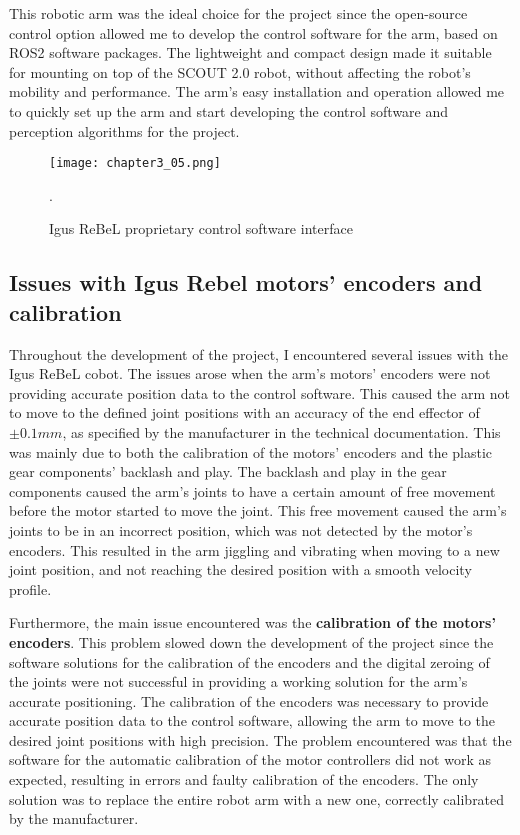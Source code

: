 This robotic arm was the ideal choice for the project since the open-source control option allowed me to develop
the control software for the arm, based on ROS2 software packages. The lightweight and compact design made it suitable
for mounting on top of the SCOUT 2.0 robot, without affecting the robot's mobility and performance. 
The arm's easy installation and operation allowed me to quickly set up the arm and start developing the control software
and perception algorithms for the project.

\begin{figure}[t]
    \centering
    \texttt{[image: chapter3\_05.png]}
    \captionsetup{width=1\linewidth}
    \caption{Igus ReBeL proprietary control software interface}.
    \label{fig:c3_img05}
\end{figure}

\subsection*{Issues with Igus Rebel motors' encoders and calibration}

Throughout the development of the project, I encountered several issues with the Igus ReBeL cobot.
The issues arose when the arm's motors' encoders were not providing accurate position data to the control software.
This caused the arm not to move to the defined joint positions with an accuracy of the end effector of $\pm 0.1mm$,
as specified by the manufacturer in the technical documentation.
This was mainly due to both the calibration of the motors' encoders and the plastic gear components' backlash and play.
The backlash and play in the gear components caused the arm's joints to have a certain amount of free movement before the motor
started to move the joint. This free movement caused the arm's joints to be in an incorrect position, which was not detected
by the motor's encoders. This resulted in the arm jiggling and vibrating when moving to a new joint position, and not reaching
the desired position with a smooth velocity profile.

Furthermore, the main issue encountered was the \textbf{calibration of the motors' encoders}.
This problem slowed down the development
of the project since the software solutions for the calibration of the encoders and the digital zeroing of the joints were not
successful in providing a working solution for the arm's accurate positioning. The calibration of the encoders was necessary
to provide accurate position data to the control software, allowing the arm to move to the desired joint positions with high
precision. The problem encountered was that the software for the automatic calibration of the motor controllers did not work
as expected, resulting in errors and faulty calibration of the encoders. The only solution was to replace the entire robot
arm with a new one, correctly calibrated by the manufacturer.


